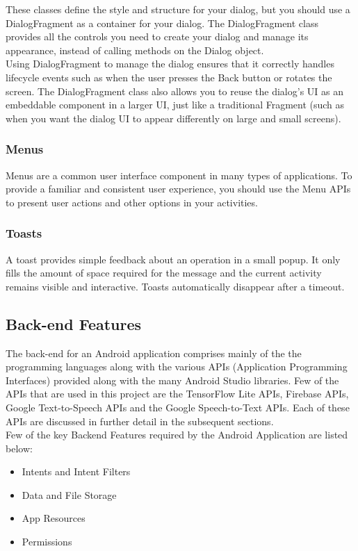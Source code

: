 \documentclass[14pt]{report}
\begin{document}
					These classes define the style and structure for your dialog, but you should use a DialogFragment as a container for your dialog. The DialogFragment class provides all the controls you need to create your dialog and manage its appearance, instead of calling methods on the Dialog object.\\

					Using DialogFragment to manage the dialog ensures that it correctly handles lifecycle events such as when the user presses the Back button or rotates the screen. The DialogFragment class also allows you to reuse the dialog's UI as an embeddable component in a larger UI, just like a traditional Fragment (such as when you want the dialog UI to appear differently on large and small screens).
			
				\subsubsection{Menus}
					Menus are a common user interface component in many types of applications. To provide a familiar and consistent user experience, you should use the Menu APIs to present user actions and other options in your activities.

				\subsubsection{Toasts}
					A toast provides simple feedback about an operation in a small popup. It only fills the amount of space required for the message and the current activity remains visible and interactive. Toasts automatically disappear after a timeout.
			\subsection{Back-end Features}
					The back-end for an Android application comprises mainly of the the programming languages along with the various APIs (Application Programming Interfaces) provided along with the many Android Studio libraries. Few of the APIs that are used in this project are the TensorFlow Lite APIs, Firebase APIs, Google Text-to-Speech APIs and the Google Speech-to-Text APIs. Each of these APIs are discussed in further detail in the subsequent sections.\\

					Few of the key Backend Features required by the Android Application are listed below:
					\begin{itemize}
						\item Intents and Intent Filters
						\item Data and File Storage
						\item App Resources
						\item Permissions
					\end{itemize}
\end{document}

